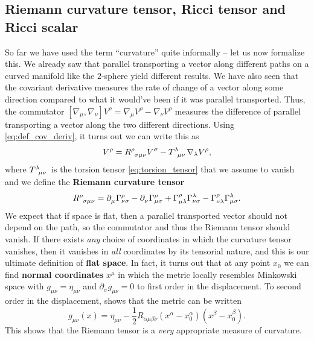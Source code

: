 \subsection{Riemann curvature tensor, Ricci tensor and Ricci scalar}


So far we have used the term ``curvature'' quite informally -- let us now formalize this.
We already saw that parallel transporting a vector along different paths on a curved manifold like the $2$-sphere yield different results.
We have also seen that the covariant derivative measures the rate of change of a vector along some direction compared to what it would've been if it was parallel transported.
Thus, the commutator $[ \nabla_\mu, \nabla_\nu ] V^\rho = \nabla_\mu V^\rho - \nabla_\nu V^\rho$ measures the difference of parallel transporting a vector along the two different directions.
Using \cref{eq:def_cov_deriv}, it turns out we can write this as
\begin{equation}
	[ \nabla_\mu, \nabla_\nu ] V^\rho = R\indices{^\rho_{\sigma \mu \nu}} V^\sigma - T\indices{^\lambda_{\mu \nu}} \nabla_\lambda V^\rho ,
\end{equation}
where $T\indices{^\lambda_{\mu \nu}}$ is the torsion tensor \eqref{eq:torsion_tensor} that we assume to vanish and we define the \textbf{Riemann curvature tensor}
\begin{equation}
	R\indices{^\rho_\sigma_\mu_\nu} =
	\partial\indices{_\mu} \Gamma^\rho_{\nu \sigma} -
	\partial\indices{_\nu} \Gamma^{\rho}_{\mu \sigma} +
	\Gamma^\rho_{\mu \lambda} \Gamma^{\lambda}_{\nu \sigma} -
	\Gamma^\rho_{\nu \lambda} \Gamma^{\lambda}_{\mu \sigma} .
	\label{eq:def_riemann_tensor}
\end{equation}
We expect that if space is flat, then a parallel transported vector should not depend on the path, so the commutator and thus the Riemann tensor should vanish.
If there exists \emph{any} choice of coordinates in which the curvature tensor vanishes, then it vanishes in \emph{all} coordinates by its tensorial nature, and this is our ultimate definition of \textbf{flat space}.
In fact, it turns out that at any point $x_0$ we can find \textbf{normal coordinates} $x^\mu$ in which the metric locally resembles Minkowski space with $g_{\mu \nu} = \eta_{\mu \nu}$ and $\partial_\sigma g_{\mu \nu} = 0$ to first order in the displacement.
To second order in the displacement, \cite{ref:metric_taylor_expansion} shows that the metric can be written
\begin{equation}
	g_{\mu \nu}(x) = \eta_{\mu \nu} - \frac12 R_{\alpha \mu \beta \nu} (x^\alpha - x_0^\alpha) (x^\beta - x_0^\beta) .
\end{equation}
This shows that the Riemann tensor is a \emph{very} appropriate measure of curvature.


